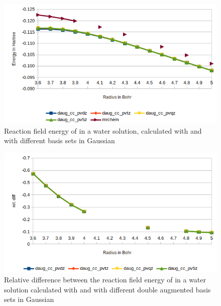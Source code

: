 \documentclass[../master_thesis.tex]{subfiles}
\begin{document}
\begin{figure}[!htb]
  \centering
    \includegraphics[width=\linewidth]{img/Erdaugcyan.png}
  \caption[Energy plots for ]{Reaction field energy of  in a water solution, calculated with \mrchem
  and with different basis sets in Gaussian}
  \label{fig:cyanEnergyplotsdaug}
\end{figure}

\begin{figure}[!htb]
  \centering
    \includegraphics[width=\linewidth]{img/nopdaugreldiff.png}
    \caption[Relative difference between  and double augmented Gaussian results]{Relative difference between the reaction field energy of  in a water solution calculated with \mrchem
  and with different double augmented basis sets in Gaussian}
  \label{fig:nopreldiffdaug}
\end{figure}
\end{document}
